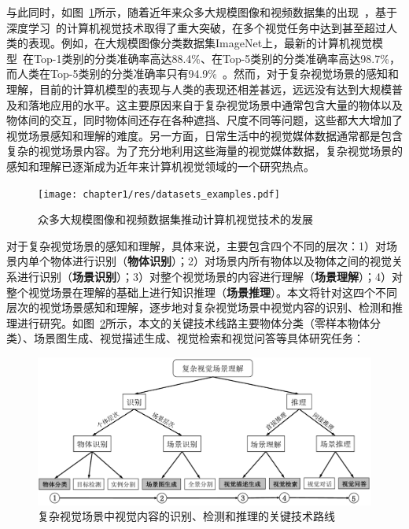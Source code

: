 与此同时，如图~\ref{ch1:fig:datasets_examples}所示，随着近年来众多大规模图像和视频数据集的出现~\cite{lin2014microsoft,russakovsky2015imagenet,krishna2017visual,karpathy2014large,miech2019howto100m}，基于深度学习~\cite{lecun2015deep,krizhevsky2012imagenet}的计算机视觉技术取得了重大突破，在多个视觉任务中达到甚至超过人类的表现。例如，在大规模图像分类数据集ImageNet上，最新的计算机视觉模型~\cite{xie2019self}在Top-1类别的分类准确率高达88.4\%、在Top-5类别的分类准确率高达98.7\%，而人类在Top-5类别的分类准确率只有94.9\%~\cite{russakovsky2015imagenet}。然而，对于复杂视觉场景的感知和理解，目前的计算机模型的表现与人类的表现还相差甚远，远远没有达到大规模普及和落地应用的水平。这主要原因来自于复杂视觉场景中通常包含大量的物体以及物体间的交互，同时物体间还存在各种遮挡、尺度不同等问题，这些都大大增加了视觉场景感知和理解的难度。另一方面，日常生活中的视觉媒体数据通常都是包含复杂的视觉场景内容。为了充分地利用这些海量的视觉媒体数据，复杂视觉场景的感知和理解已逐渐成为近年来计算机视觉领域的一个研究热点。

\begin{figure}[t]
    \centering
        \texttt{[image: chapter1/res/datasets\_examples.pdf]}
    \caption{众多大规模图像和视频数据集推动计算机视觉技术的发展}
    \label{ch1:fig:datasets_examples}
\end{figure}

对于复杂视觉场景的感知和理解，具体来说，主要包含四个不同的层次：1）对场景内单个物体进行识别（\textbf{物体识别}）；2）对场景内所有物体以及物体之间的视觉关系进行识别（\textbf{场景识别}）；3）对整个视觉场景的内容进行理解（\textbf{场景理解}）；4）对整个视觉场景在理解的基础上进行知识推理（\textbf{场景推理}）。本文将针对这四个不同层次的视觉场景感知和理解，逐步地对复杂视觉场景中视觉内容的识别、检测和推理进行研究。如图~\ref{ch1:fig:scene_understanding}所示，本文的关键技术线路主要物体分类（零样本物体分类）、场景图生成、视觉描述生成、视觉检索和视觉问答等具体研究任务：

\begin{figure}[t]
    \centering
        \includegraphics[width=0.95\linewidth]{chapter1/res/scene_understanding.pdf}
    \centering
    \caption{复杂视觉场景中视觉内容的识别、检测和推理的关键技术路线}
    \label{ch1:fig:scene_understanding}
\end{figure}


